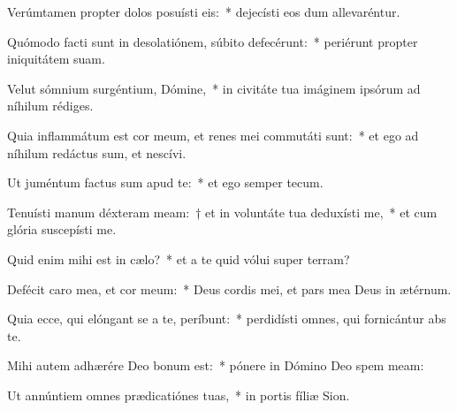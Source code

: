 \item Verúmtamen propter dolos posuísti eis:~* dejecísti eos dum allevaréntur.

\item Quómodo facti sunt in desolatiónem, súbito defecérunt:~* periérunt propter iniquitátem suam.

\item Velut sómnium surgéntium, Dómine,~* in civitáte tua imáginem ipsórum ad níhilum rédiges.

\item Quia inflammátum est cor meum, et renes mei commutáti sunt:~* et ego ad níhilum redáctus sum, et nescívi.

\item Ut juméntum factus sum apud te:~* et ego semper tecum.

\item Tenuísti manum déxteram meam:~† et in voluntáte tua deduxísti me,~* et cum glória suscepísti me.

\item Quid enim mihi est in cælo?~* et a te quid vólui super terram?

\item Defécit caro mea, et cor meum:~* Deus cordis mei, et pars mea Deus in ætérnum.

\item Quia ecce, qui elóngant se a te, períbunt:~* perdidísti omnes, qui fornicántur abs te.

\item Mihi autem adhærére Deo bonum est:~* pónere in Dómino Deo spem meam:

\item Ut annúntiem omnes prædicatiónes tuas,~* in portis fíliæ Sion.

